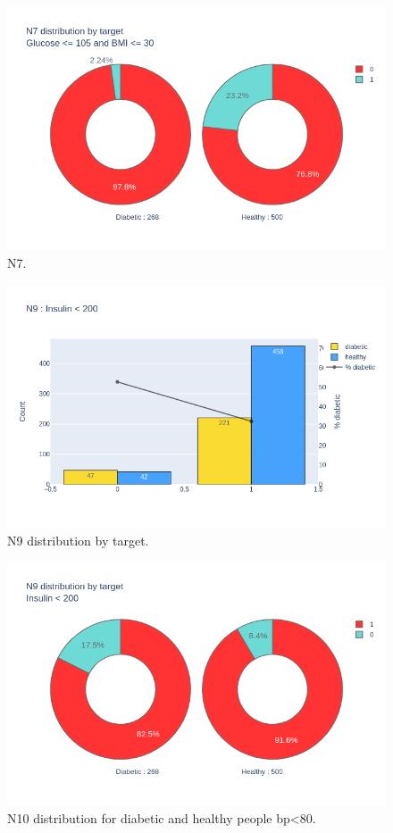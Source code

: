 \documentclass[12pt]{article}
\begin{document}
\begin{figure}[ht]
\centering
\includegraphics[width=1\textwidth]{newplot(30).png}
\caption{N7.}
\end{figure}


\begin{figure}[ht]
\centering
\includegraphics[width=1\textwidth]{newplot(32).png}
\caption{N9 distribution by target.}
\end{figure}

\begin{figure}[ht]
\centering
\includegraphics[width=1\textwidth]{newplot(33).png}
\caption{N10 distribution for diabetic and healthy people bp<80.}
\end{figure}
\end{document}

